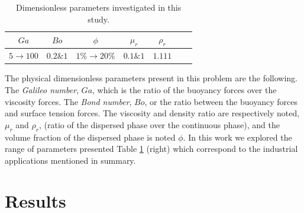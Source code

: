 \documentclass[9pt,a4paper]{article}
\begin{document}
\begin{table}[h!]
    \centering

    \begin{tabular}{ccccccc}\hline
        $Ga$&$Bo$&$\phi$&$ \mu_r$&$\rho_r$\\ \hline\hline
        $5\rightarrow 100$&$0.2 \&  1$&$1\% \rightarrow 20\%$&$0.1 \& 1$&$1.111$\\ \hline
    \end{tabular}
    \vfill
    
    \caption{Dimensionless parameters investigated in this study.}
    \label{fig:pic}
\end{table}
The physical dimensionless parameters present in this problem are the following. 
The \textit{Galileo number}, $Ga$, which is the ratio of the buoyancy forces over
the viscosity forces.
The \textit{Bond number}, $Bo$, or the ratio between the buoyancy forces and surface tension forces.
The viscosity and density ratio are respectively noted, $\mu_r$ and $\rho_r$, (ratio of the dispersed phase over the continuous phase),
and the volume fraction of the dispersed phase is noted $\phi$. 
In this work we explored the range of parameters presented Table \ref{fig:pic} (right) which correspond to the industrial applications mentioned in summary.  

\section{Results}
\setlength{\parindent}{10pt}
\end{document}
